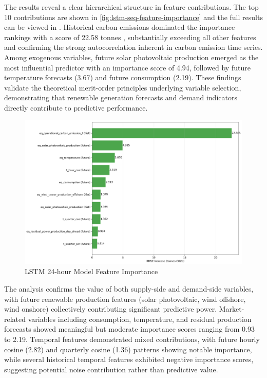 The results reveal a clear hierarchical structure in feature contributions. The top 10 contributions are shown in \autoref{fig:lstm-seq-feature-importance} and the full results can be viewed in . Historical carbon emissions dominated the importance rankings with a score of 22.58 tonnes \cotwoe{}, substantially exceeding all other features and confirming the strong autocorrelation inherent in carbon emission time series. Among exogenous variables, future solar photovoltaic production emerged as the most influential predictor with an importance score of 4.94, followed by future temperature forecasts (3.67) and future consumption (2.19). These findings validate the theoretical merit-order principles underlying variable selection, demonstrating that renewable generation forecasts and demand indicators directly contribute to predictive performance.

\begin{figure}[ht]
  \centering
  \includegraphics[width=16cm]{sections/figures/lstm_seq_feature_importance.png}
  \caption{LSTM 24-hour Model Feature Importance}
  \label{fig:lstm-seq-feature-importance}
\end{figure}

The analysis confirms the value of both supply-side and demand-side variables, with future renewable production features (solar photovoltaic, wind offshore, wind onshore) collectively contributing significant predictive power. Market-related variables including consumption, temperature, and residual production forecasts showed meaningful but moderate importance scores ranging from 0.93 to 2.19. Temporal features demonstrated mixed contributions, with future hourly cosine (2.82) and quarterly cosine (1.36) patterns showing notable importance, while several historical temporal features exhibited negative importance scores, suggesting potential noise contribution rather than predictive value.

